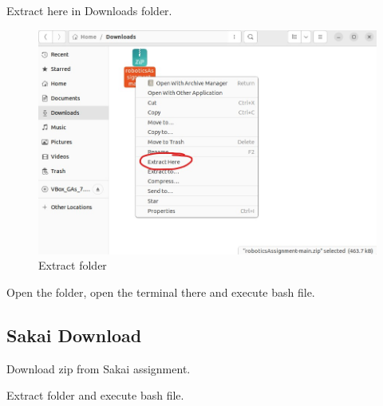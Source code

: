 Extract here in Downloads folder. 
\begin{figure}[H]
    \centering
    \includegraphics[width=0.8\linewidth]{document//Figure/06extract.jpg}
    \caption{Extract folder}
\end{figure}

Open the folder, open the terminal there and execute bash file.

\newpage

\subsection{Sakai Download}
Download zip from Sakai assignment.

Extract folder and execute bash file. 
